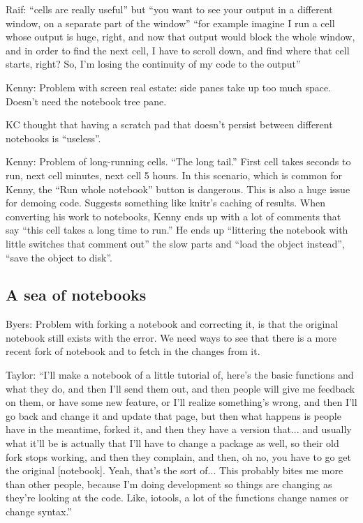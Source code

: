Raif: ``cells are really useful'' but ``you want to see your output in a
different window, on a separate part of the window'' ``for example imagine I run
a cell whose output is huge, right, and now that output would block the whole
window, and in order to find the next cell, I have to scroll down, and find
where that cell starts, right? So, I'm losing the continuity of my code to the
output''


Kenny: Problem with screen real estate: side panes take up too much
space. Doesn't need the notebook tree pane.

KC thought that having a scratch pad that doesn't persist between different
notebooks is ``useless''.

Kenny: Problem of long-running cells.  ``The long tail.''  First cell takes
seconds to run, next cell minutes, next cell 5 hours.  In this scenario, which
is common for Kenny, the ``Run whole notebook'' button is dangerous. This is
also a huge issue for demoing code.  Suggests something like knitr's caching of
results. When converting his work to notebooks, Kenny ends up with a lot of
comments that say ``this cell takes a long time to run.'' He ends up ``littering
the notebook with little switches that comment out'' the slow parts and ``load
the object instead'', ``save the object to disk''.


\subsection{A sea of notebooks}

Byers: Problem with forking a notebook and correcting it, is that the original
notebook still exists with the error.  We need ways to see that there is a more
recent fork of notebook and to fetch in the changes from it.

Taylor: ``I'll make a notebook of a little tutorial of, here's the basic
functions and what they do, and then I'll send them out, and then people will
give me feedback on them, or have some new feature, or I'll realize something's
wrong, and then I'll go back and change it and update that page, but then what
happens is people have in the meantime, forked it, and then they have a version
that... and usually what it'll be is actually that I'll have to change a package
as well, so their old fork stops working, and then they complain, and then, oh
no, you have to go get the original [notebook]. Yeah, that's the sort of... This
probably bites me more than other people, because I'm doing development so
things are changing as they're looking at the code. Like, iotools, a lot of the
functions change names or change syntax.''

